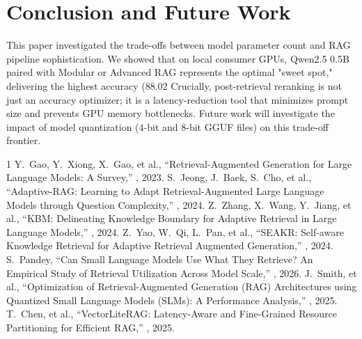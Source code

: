 \documentclass[conference]{IEEEtran}
\begin{document}
\section{Conclusion and Future Work}
This paper investigated the trade-offs between model parameter count and RAG pipeline sophistication. We showed that on local consumer GPUs, Qwen2.5 0.5B paired with Modular or Advanced RAG represents the optimal "sweet spot," delivering the highest accuracy (88.02%
Crucially, post-retrieval reranking is not just an accuracy optimizer; it is a latency-reduction tool that minimizes prompt size and prevents GPU memory bottlenecks. Future work will investigate the impact of model quantization ($4$-bit and $8$-bit GGUF files) on this trade-off frontier.

\begin{thebibliography}{1}
Y.~Gao, Y.~Xiong, X.~Gao, et al., ``Retrieval-Augmented Generation for Large Language Models: A Survey,'' , 2023.
S.~Jeong, J.~Baek, S.~Cho, et al., ``Adaptive-RAG: Learning to Adapt Retrieval-Augmented Large Language Models through Question Complexity,'' , 2024.
Z.~Zhang, X.~Wang, Y.~Jiang, et al., ``KBM: Delineating Knowledge Boundary for Adaptive Retrieval in Large Language Models,'' , 2024.
Z.~Yao, W.~Qi, L.~Pan, et al., ``SEAKR: Self-aware Knowledge Retrieval for Adaptive Retrieval Augmented Generation,'' , 2024.
S.~Pandey, ``Can Small Language Models Use What They Retrieve? An Empirical Study of Retrieval Utilization Across Model Scale,'' , 2026.
J.~Smith, et al., ``Optimization of Retrieval-Augmented Generation (RAG) Architectures using Quantized Small Language Models (SLMs): A Performance Analysis,'' , 2025.
T.~Chen, et al., ``VectorLiteRAG: Latency-Aware and Fine-Grained Resource Partitioning for Efficient RAG,'' , 2025.
\end{thebibliography}
\end{document}
